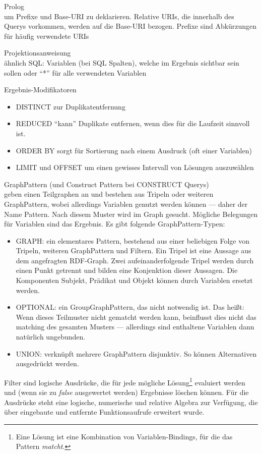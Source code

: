 \begin{itemize}
	\item{Prolog\\um Prefixe und Base-URI zu deklarieren. Relative URIs, die innerhalb des Querys vorkommen, werden auf die Base-URI bezogen. Prefixe sind Abkürzungen für häufig verwendete URIs} 
	\item{Projektionsanweisung\\ähnlich SQL: Variablen (bei SQL Spalten), welche im Ergebnis sichtbar sein sollen oder "`*"' für alle verwendeten Variablen}
	\item{Ergebnis-Modifikatoren
	\begin{itemize}
		\item{DISTINCT zur Duplikatentfernung} 
		\item{REDUCED "`kann"' Duplikate entfernen, wenn dies für die Laufzeit sinnvoll ist.}
		\item{ORDER BY sorgt für Sortierung nach einem Ausdruck (oft einer Variablen)}
		\item{LIMIT und OFFSET um einen gewisses Intervall von Lösungen auszuwählen}
	\end{itemize}
	}
	\item{GraphPattern (und Construct Pattern bei CONSTRUCT Querys)\\
	geben einen Teilgraphen an und bestehen aus Tripeln oder weiteren GraphPattern, wobei allerdings Variablen genutzt werden können --- daher der Name Pattern. Nach diesem Muster wird im Graph gesucht. Mögliche Belegungen für Variablen sind das Ergebnis.
	Es gibt folgende GraphPattern-Typen:
	\begin{itemize}
		\item{GRAPH: ein elementares Pattern, bestehend aus einer beliebigen Folge von Tripeln, weiteren GraphPattern und Filtern. Ein Tripel ist eine Aussage aus dem angefragten RDF-Graph. Zwei aufeinanderfolgende Tripel werden durch einen Punkt getrennt und bilden eine Konjenktion dieser Aussagen. Die Komponenten Subjekt, Prädikat und Objekt können durch Variablen ersetzt werden.}
		\item{OPTIONAL: ein GroupGraphPattern, das nicht notwendig ist. Das heißt: Wenn dieses Teilmuster nicht gematcht werden kann, beinflusst dies nicht das matching des gesamten Musters --- allerdings sind enthaltene Variablen dann natürlich ungebunden.} 
		\item{UNION: verknüpft mehrere GraphPattern disjunktiv. So können Alternativen ausgedrückt werden.}
	\end{itemize}
	\item{Filter sind logische Ausdrücke, die für jede mögliche Lösung\footnote{Eine Lösung ist eine Kombination von Variablen-Bindings, für die das Pattern \emph{matcht}.} evaluiert werden und (wenn sie zu \emph{false} ausgewertet werden) Ergebnisse löschen können. Für die Ausdrücke steht eine logische, numerische und relative Algebra zur Verfügung, die über eingebaute und entfernte Funktionsaufrufe erweitert wurde.
	}
	}
\end{itemize}
